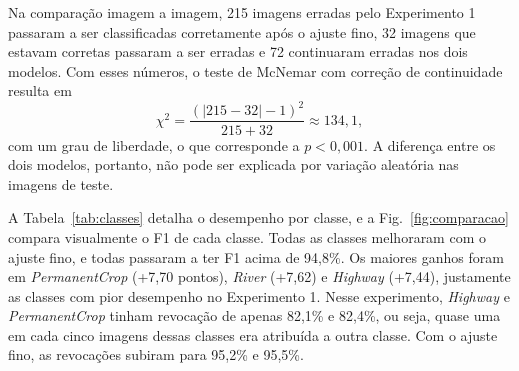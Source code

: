 \documentclass[conference,a4paper]{IEEEtran}
\begin{document}
Na comparação imagem a imagem, 215 imagens erradas pelo Experimento 1 passaram a ser classificadas corretamente após o ajuste fino, 32 imagens que estavam corretas passaram a ser erradas e 72 continuaram erradas nos dois modelos. Com esses números, o teste de McNemar com correção de continuidade resulta em
\begin{equation}
\chi^2 = \frac{(|215 - 32| - 1)^2}{215 + 32} \approx 134{,}1,
\label{eq:mcnemar}
\end{equation}
com um grau de liberdade, o que corresponde a $p < 0{,}001$. A diferença entre os dois modelos, portanto, não pode ser explicada por variação aleatória nas imagens de teste.

A Tabela~\ref{tab:classes} detalha o desempenho por classe, e a Fig.~\ref{fig:comparacao} compara visualmente o F1 de cada classe. Todas as classes melhoraram com o ajuste fino, e todas passaram a ter F1 acima de 94,8\%. Os maiores ganhos foram em \textit{PermanentCrop} (+7,70 pontos), \textit{River} (+7,62) e \textit{Highway} (+7,44), justamente as classes com pior desempenho no Experimento 1. Nesse experimento, \textit{Highway} e \textit{PermanentCrop} tinham revocação de apenas 82,1\% e 82,4\%, ou seja, quase uma em cada cinco imagens dessas classes era atribuída a outra classe. Com o ajuste fino, as revocações subiram para 95,2\% e 95,5\%.
\end{document}
